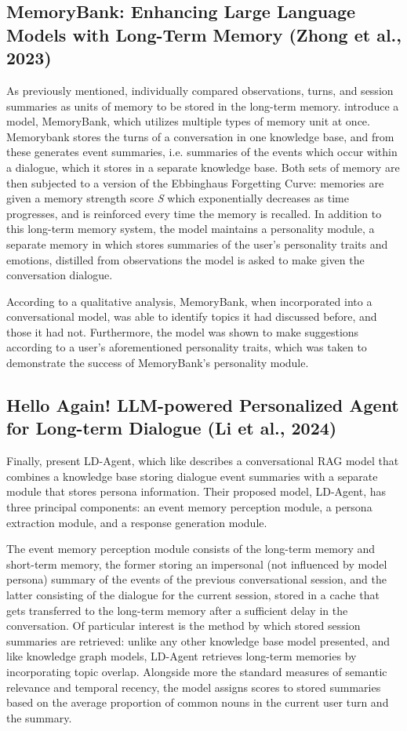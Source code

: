 	
\subsection{MemoryBank: Enhancing Large Language Models with Long-Term Memory (Zhong et al., 2023)}
		
As previously mentioned, \cite{Maharana2024} individually compared observations, turns, and session summaries as units of memory to be stored in the long-term memory. \cite{Zhong2023} introduce a model, MemoryBank, which utilizes multiple types of memory unit at once. Memorybank stores the turns of a conversation in one knowledge base, and from these generates event summaries, i.e. summaries of the events which occur within a dialogue, which it stores in a separate knowledge base. Both sets of memory are then subjected to a version of the Ebbinghaus Forgetting Curve: memories are given a memory strength score \textit{S} which exponentially decreases as time progresses, and is reinforced every time the memory is recalled. In addition to this long-term memory system, the model maintains a personality module, a separate memory in which stores summaries of the user's personality traits and emotions, distilled from observations the model is asked to make given the conversation dialogue. 
	
According to a qualitative analysis, MemoryBank, when incorporated into a conversational model, was able to identify topics it had discussed before, and those it had not. Furthermore, the model was shown to make suggestions according to a user's aforementioned personality traits, which was taken to demonstrate the success of MemoryBank's personality module.


\subsection{Hello Again! LLM-powered Personalized Agent for Long-term Dialogue (Li et al., 2024)}

Finally, \cite{Li2024} present LD-Agent, which like \cite{Zhong2023} describes a conversational RAG model that combines a knowledge base storing dialogue event summaries with a separate module that stores persona information. Their proposed model, LD-Agent, has three principal components: an event memory perception module, a persona extraction module, and a response generation module. 
	
The event memory perception module consists of the long-term memory and short-term memory, the former storing an impersonal (not influenced by model persona) summary of the events of the previous conversational session, and the latter consisting of the dialogue for the current session, stored in a cache that gets transferred to the long-term memory after a sufficient delay in the conversation. Of particular interest is the method by which stored session summaries are retrieved: unlike any other knowledge base model presented, and like knowledge graph models, LD-Agent retrieves long-term memories by incorporating topic overlap. Alongside more the standard measures of semantic relevance and temporal recency, the model assigns scores to stored summaries based on the average proportion of common nouns in the current user turn and the summary.

